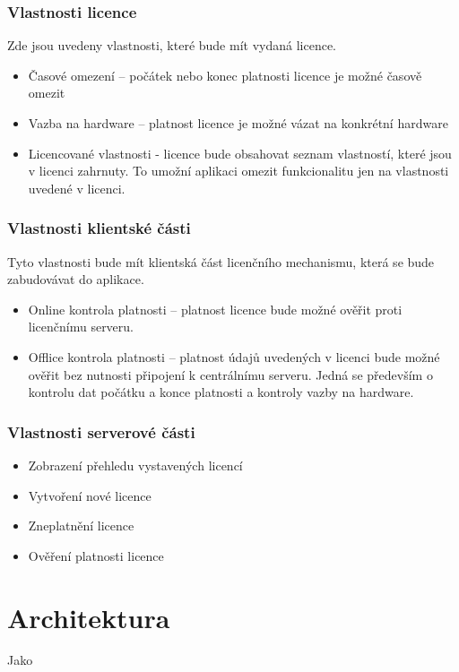 \subsubsection*{Vlastnosti licence}

Zde jsou uvedeny vlastnosti, které bude mít vydaná licence.

\begin{itemize}
  \item Časové omezení – počátek nebo konec platnosti licence je možné časově
  omezit
  \item Vazba na hardware – platnost licence je možné vázat na konkrétní
  hardware
  \item Licencované vlastnosti - licence bude obsahovat seznam vlastností, které
  jsou v licenci zahrnuty. To umožní aplikaci omezit funkcionalitu jen na
  vlastnosti uvedené v licenci.
\end{itemize}

\subsubsection*{Vlastnosti klientské části}

Tyto vlastnosti bude mít klientská část licenčního mechanismu, která se bude
zabudovávat do aplikace.

\begin{itemize}
  \item Online kontrola platnosti – platnost licence bude možné ověřit proti
  licenčnímu serveru.
  \item Offlice kontrola platnosti – platnost údajů uvedených v licenci bude
  možné ověřit bez nutnosti připojení k centrálnímu serveru. Jedná se především
  o kontrolu dat počátku a konce platnosti a kontroly vazby na hardware.
\end{itemize}

\subsubsection*{Vlastnosti serverové části}

\begin{itemize}
  \item Zobrazení přehledu vystavených licencí
  \item Vytvoření nové licence
  \item Zneplatnění licence
  \item Ověření platnosti licence
\end{itemize}

\section{Architektura}

Jako 
